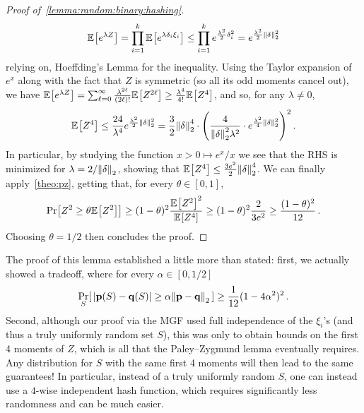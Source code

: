 \begin{proof}[Proof of~\cref{lemma:random:binary:hashing}]
\[
  \bEE{e^{\lambda Z}} 
  = \prod_{i=1}^\ab \bEE{e^{\lambda\delta_i \xi_i}}
  \leq \prod_{i=1}^\ab e^{\frac{\lambda^2}{2}\delta_i^2}
  = e^{\frac{\lambda^2}{2}\normtwo{\delta}^2}
\]
relying on, \eg Hoeffding's Lemma for the inequality. Using the Taylor expansion of $e^x$ along with the fact that $Z$ is symmetric (so all its odd moments cancel out), we have
$
  \bEE{e^{\lambda Z}} = \sum_{\ell=0}^\infty \frac{\lambda^{2\ell}}{(2\ell)!}\bEE{Z^{2\ell}} \geq \frac{\lambda^{4}}{4!}\bEE{Z^{4}} 
$, and so, for any $\lambda\neq 0$,
\[
    \bEE{Z^{4}} \leq \frac{24}{\lambda^4}e^{\frac{\lambda^2}{2}\normtwo{\delta}^2}
    = \frac{3}{2}\normtwo{\delta}^4\cdot \Paren{\frac{4}{\normtwo{\delta}^2\lambda^2}\cdot e^{\frac{\lambda^2}{4}\normtwo{\delta}^2}}^2\,.
\]
In particular, by studying the function $x>0 \mapsto e^x/x$ we see that the RHS is minimized for $\lambda = 2/\normtwo{\delta}$, showing that
$
    \bEE{Z^{4}} \leq \frac{3e^2}{2}\normtwo{\delta}^4
$. 
We can finally apply~\cref{theo:pz}, getting that, for every $\theta\in[0,1]$,
\[
 \bPr{ Z^2 \geq \theta \bEE{Z^2} } \geq (1-\theta)^2\frac{\bEE{Z^2}^2}{\bEE{Z^4}} \geq (1-\theta)^2\frac{2}{3e^2}
 \geq \frac{(1-\theta)^2}{12}\,.
\]
Choosing $\theta=1/2$ then concludes the proof.
\end{proof}
\begin{remark}
The proof of this lemma established a little more than stated: first, we actually showed a tradeoff, where for every $\alpha\in[0,1/2]$
\[
\probaDistrOf{S}{ |\p(S)-\q(S)| \geq \alpha\normtwo{\p-\q} } \geq \frac{1}{12}(1-4\alpha^2)^2\,.
\]
Second, although our proof via the MGF used full independence of the $\xi_i$'s (and thus a truly uniformly random set $S$), this was only to obtain bounds on the first 4 moments of $Z$, which is all that the Paley--Zygmund lemma eventually requires. Any distribution for $S$ with the same first 4 moments will then lead to the same guarantees! In particular, instead of a truly uniformly random $S$, one can instead use a $4$-wise independent hash function, which requires significantly less randomness and can be much easier.
\end{remark}

